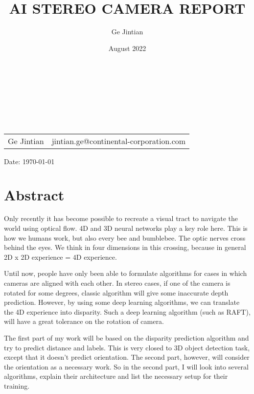 \documentclass[12pt]{article}
\date{August 2022}
\title{AI STEREO CAMERA REPORT}
\author{Ge Jintian}
\begin{document}
\begin{titlepage}
  \centering

  \hrulefill\par~\\
  \begin{large}
  \end{large}
  \hrulefill\\
  \vspace{4cm}
  \Large {}\\~\\

  \small
  \vspace{10cm}
  \begin{tabular}{l l}
    Ge Jintian & jintian.ge@continental-corporation.com
  \end{tabular}
\vfill
  Date: {\today}
\end{titlepage}
\newpage
\setcounter{tocdepth}{2}
\tableofcontents
\pagebreak
\section{Abstract}
Only recently it has become possible to recreate a visual tract to navigate the world using optical flow. 4D and 3D neural networks play a key role here. This is how we humans work, but also every bee and bumblebee. The optic nerves cross behind the eyes. We think in four dimensions in this crossing, because in general 2D x 2D experience = 4D experience. 

Until now, people have only been able to formulate algorithms for cases in which cameras are aligned with each other. In stereo cases, if one of the camera is rotated for some degrees, classic algorithm will give some inaccurate depth prediction. However, by using some deep learning algorithms, we can translate the 4D experience into disparity. Such a deep learning algorithm (such as RAFT), will have a great tolerance on the rotation of camera.

The first part of my work will be based on the disparity prediction algorithm and try to predict distance and labels. This is very closed to 3D object detection task, except that it doesn't predict orientation. The second part, however, will consider the orientation as a necessary work. So in the second part, I will look into several algorithms, explain their architecture and list the necessary setup for their training.
\end{document}
